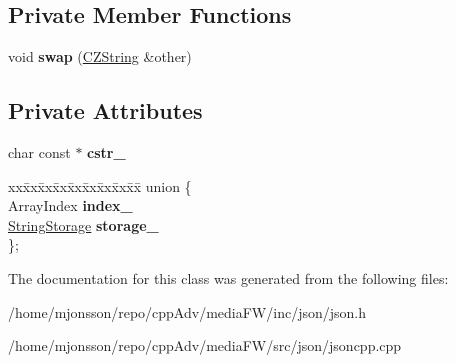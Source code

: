 \subsection*{Private Member Functions}
\begin{DoxyCompactItemize}
\item 
\mbox{\label{classJson_1_1Value_1_1CZString_ad59f3542d2eea749a6a63409d1a02207}} 
void {\bfseries swap} (\hyperlink{classJson_1_1Value_1_1CZString}{C\+Z\+String} \&other)
\end{DoxyCompactItemize}
\subsection*{Private Attributes}
\begin{DoxyCompactItemize}
\item 
\mbox{\label{classJson_1_1Value_1_1CZString_a5b4d28349294034d7f779c3c95d0306c}} 
char const  $\ast$ {\bfseries cstr\+\_\+}
\item 
\mbox{\label{classJson_1_1Value_1_1CZString_a6f6b20ee7c8873fba58100f869ca2e5e}} 
\begin{tabbing}
xx\=xx\=xx\=xx\=xx\=xx\=xx\=xx\=xx\=\kill
union \{\\
\>ArrayIndex {\bfseries index\_}\\
\>\hyperlink{structJson_1_1Value_1_1CZString_1_1StringStorage}{StringStorage} {\bfseries storage\_}\\
\}; \\

\end{tabbing}\end{DoxyCompactItemize}


The documentation for this class was generated from the following files\+:\begin{DoxyCompactItemize}
\item 
/home/mjonsson/repo/cpp\+Adv/media\+F\+W/inc/json/json.\+h\item 
/home/mjonsson/repo/cpp\+Adv/media\+F\+W/src/json/jsoncpp.\+cpp\end{DoxyCompactItemize}
